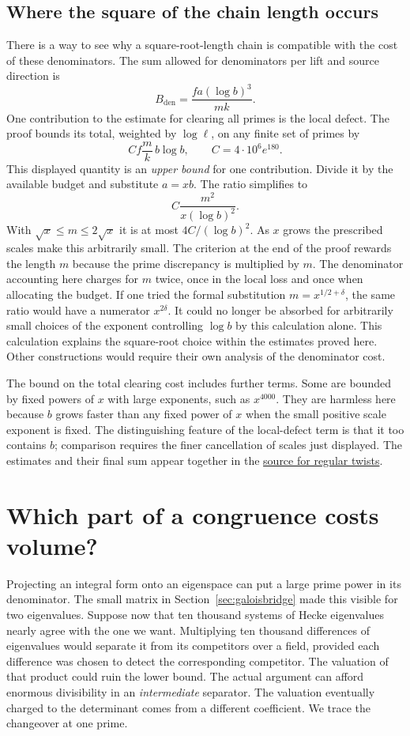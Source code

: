 \documentclass[11pt,letterpaper]{article}
\newcommand{\sref}[2]{\href{https://github.com/VladimirReshetnikov/ProveIt/blob/d8415e76ad850651f8c0083afe689dd9f4a45a10/Analysis/GeneralizedRiemannHypothesis/vendor/grh-lean/grh/src/#1.lean}{#2}}
\begin{document}
\subsection{Where the square of the chain length occurs}
There is a way to see why a square-root-length chain is compatible with the cost of these denominators. The sum allowed for denominators per lift and source direction is
\[
            B_{\mathrm{den}}=\frac{fa(\log b)^3}{mk}.
\]
One contribution to the estimate for clearing all primes is the local defect. The proof bounds its total, weighted by \(\log\ell\), on any finite set of primes by
\[
       C f\frac{m}{k}\,b\log b,
             \qquad C=4\cdot10^6 e^{180}.
\]
This displayed quantity is an \emph{upper bound} for one contribution. Divide it by the available budget and substitute \(a=xb\). The ratio simplifies to
\[
       C\frac{m^2}{x(\log b)^2}.
\]
With \(\sqrt x\le m\le2\sqrt x\) it is at most \(4C/(\log b)^2\). As \(x\) grows the prescribed scales make this arbitrarily small. The criterion at the end of the proof rewards the length \(m\) because the prime discrepancy is multiplied by \(m\). The denominator accounting here charges for \(m\) twice, once in the local loss and once when allocating the budget. If one tried the formal substitution \(m=x^{1/2+\delta}\), the same ratio would have a numerator \(x^{2\delta}\). It could no longer be absorbed for arbitrarily small choices of the exponent controlling \(\log b\) by this calculation alone. This calculation explains the square-root choice within the estimates proved here. Other constructions would require their own analysis of the denominator cost.

The bound on the total clearing cost includes further terms. Some are bounded by fixed powers of \(x\) with large exponents, such as \(x^{4000}\). They are harmless here because \(b\) grows faster than any fixed power of \(x\) when the small positive scale exponent is fixed. The distinguishing feature of the local-defect term is that it too contains \(b\); comparison requires the finer cancellation of scales just displayed. The estimates and their final sum appear together in the \sref{New/Congruences/FitTwistsExist}{source for regular twists}.

\section{Which part of a congruence costs volume?}\label{sec:denominatorlab}

Projecting an integral form onto an eigenspace can put a large prime power in its denominator. The small matrix in Section~\ref{sec:galoisbridge} made this visible for two eigenvalues. Suppose now that ten thousand systems of Hecke eigenvalues nearly agree with the one we want. Multiplying ten thousand differences of eigenvalues would separate it from its competitors over a field, provided each difference was chosen to detect the corresponding competitor. The valuation of that product could ruin the lower bound. The actual argument can afford enormous divisibility in an \emph{intermediate} separator. The valuation eventually charged to the determinant comes from a different coefficient. We trace the changeover at one prime.
\end{document}
